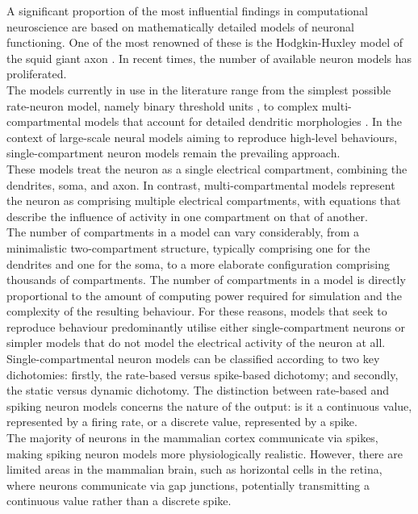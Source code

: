 \noindent A significant proportion of the most influential findings in computational neuroscience are based on mathematically detailed models of neuronal functioning. One of the most renowned of these is the Hodgkin-Huxley model of the squid giant axon \cite{hodgkin1952quantitative}. In recent times, the number of available neuron models has proliferated. \\

\noindent The models currently in use in the literature range from the simplest possible rate-neuron model, namely binary threshold units \cite{stocks2001information}, to complex multi-compartmental models that account for detailed dendritic morphologies \cite{markram2015reconstruction}. In the context of large-scale neural models aiming to reproduce high-level behaviours, single-compartment neuron models remain the prevailing approach. \\

\noindent These models treat the neuron as a single electrical compartment, combining the dendrites, soma, and axon. In contrast, multi-compartmental models represent the neuron as comprising multiple electrical compartments, with equations that describe the influence of activity in one compartment on that of another. \\

\noindent The number of compartments in a model can vary considerably, from a minimalistic two-compartment structure, typically comprising one for the dendrites and one for the soma, to a more elaborate configuration comprising thousands of compartments. The number of compartments in a model is directly proportional to the amount of computing power required for simulation and the complexity of the resulting behaviour. For these reasons, models that seek to reproduce behaviour predominantly utilise either single-compartment neurons or simpler models that do not model the electrical activity of the neuron at all. \\

\noindent Single-compartmental neuron models can be classified according to two key dichotomies: firstly, the rate-based versus spike-based dichotomy; and secondly, the static versus dynamic dichotomy. The distinction between rate-based and spiking neuron models concerns the nature of the output: is it a continuous value, represented by a firing rate, or a discrete value, represented by a spike.\\

\noindent The majority of neurons in the mammalian cortex communicate via spikes, making spiking neuron models more physiologically realistic. However, there are limited areas in the mammalian brain, such as horizontal cells in the retina, where neurons communicate via gap junctions, potentially transmitting a continuous value rather than a discrete spike. \\


